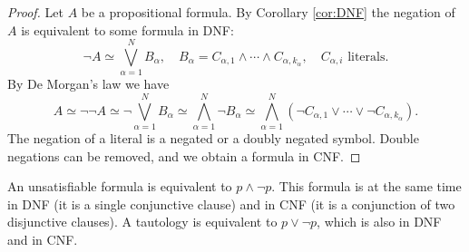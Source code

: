 

\setcounter{section}{1}
\setcounter{subsection}{5}
\setcounter{dfn}{19}

\begin{proof}
Let $A$ be a propositional formula.
By Corollary \ref{cor:DNF} the negation of $A$ is equivalent to some formula in DNF:
\[
\neg A \simeq \bigvee_{\alpha = 1}^N B_\alpha, \quad B_\alpha = C_{\alpha,1} \wedge \cdots \wedge C_{\alpha,k_{\alpha}}, \quad C_{\alpha,i} \text{ literals}.
\]
By De Morgan's law we have
\[
A \simeq \neg\neg A \simeq \neg \bigvee_{\alpha = 1}^N B_\alpha \simeq \bigwedge_{\alpha = 1}^N \neg B_\alpha
\simeq \bigwedge_{\alpha = 1}^N (\neg C_{\alpha,1} \vee \cdots \vee \neg C_{\alpha,k_{\alpha}}).
\]
The negation of a literal is a negated or a doubly negated symbol.
Double negations can be removed, and we obtain a formula in CNF.
\end{proof}

An unsatisfiable formula is equivalent to $p \wedge \neg p$.
This formula is at the same time in DNF (it is a single conjunctive clause) and in CNF (it is a conjunction of two disjunctive clauses).
A tautology is equivalent to $p \vee \neg p$, which is also in DNF and in CNF.



